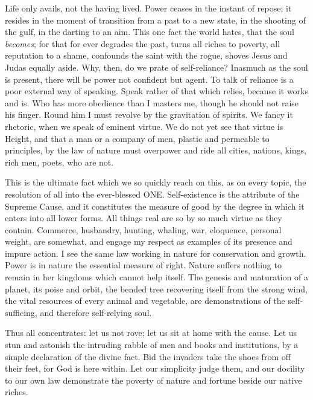 \documentclass{article}
\begin{document}
Life only avails, not the having lived. Power ceases in the instant of
repose; it resides in the moment of transition from a past to a new state,
in the shooting of the gulf, in the darting to an aim. This one fact the
world hates, that the soul {\it becomes}; for that for ever degrades the past,
turns all riches to poverty, all reputation to a shame, confounds the saint
with the rogue, shoves Jesus and Judas equally aside. Why, then, do we prate
of self-reliance? Inasmuch as the soul is present, there will be power not
confident but agent. To talk of reliance is a poor external way of speaking.
Speak rather of that which relies, because it works and is. Who has more
obedience than I masters me, though he should not raise his finger. Round
him I must revolve by the gravitation of spirits. We fancy it rhetoric, when
we speak of eminent virtue. We do not yet see that virtue is Height, and
that a man or a company of men, plastic and permeable to principles, by the
law of nature must overpower and ride all cities, nations, kings, rich men,
poets, who are not.

This is the ultimate fact which we so quickly reach on this, as on every
topic, the resolution of all into the ever-blessed ONE. Self-existence is
the attribute of the Supreme Cause, and it constitutes the measure of good
by the degree in which it enters into all lower forms. All things real are
so by so much virtue as they contain. Commerce, husbandry, hunting, whaling,
war, eloquence, personal weight, are somewhat, and engage my respect as
examples of its presence and impure action. I see the same law working in
nature for conservation and growth. Power is in nature the essential measure
of right. Nature suffers nothing to remain in her kingdoms which cannot help
itself. The genesis and maturation of a planet, its poise and orbit, the
bended tree recovering itself from the strong wind, the vital resources of
every animal and vegetable, are demonstrations of the self-sufficing, and
therefore self-relying soul.

Thus all concentrates: let us not rove; let us sit at home with the cause.
Let us stun and astonish the intruding rabble of men and books and
institutions, by a simple declaration of the divine fact. Bid the invaders
take the shoes from off their feet, for God is here within. Let our
simplicity judge them, and our docility to our own law demonstrate the
poverty of nature and fortune beside our native riches.
\end{document}

